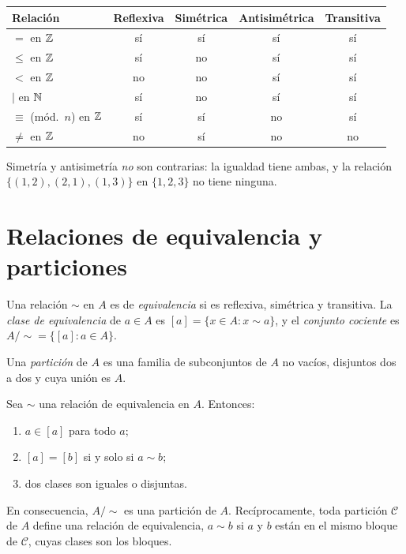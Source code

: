 \begin{center}\small
\begin{tabular}{@{}lcccc@{}}
\toprule
Relación & Reflexiva & Simétrica & Antisimétrica & Transitiva \\
\midrule
$=$ en $\mathbb{Z}$ & sí & sí & sí & sí \\
$\le$ en $\mathbb{Z}$ & sí & no & sí & sí \\
$<$ en $\mathbb{Z}$ & no & no & sí & sí \\
$\mid$ en $\mathbb{N}$ & sí & no & sí & sí \\
$\equiv$ (mód.\ $n$) en $\mathbb{Z}$ & sí & sí & no & sí \\
$\neq$ en $\mathbb{Z}$ & no & sí & no & no \\
\bottomrule
\end{tabular}
\end{center}

Simetría y antisimetría \emph{no} son contrarias: la igualdad tiene ambas, y la relación $\{(1,2),(2,1),(1,3)\}$ en $\{1,2,3\}$ no tiene ninguna.

\section{Relaciones de equivalencia y particiones}

\begin{definicion}
Una relación $\sim$ en $A$ es de \emph{equivalencia} si es reflexiva, simétrica y transitiva. La \emph{clase de equivalencia} de $a\in A$ es $[a]=\{x\in A: x\sim a\}$, y el \emph{conjunto cociente} es $A/{\sim}=\{[a]: a\in A\}$.
\end{definicion}

\begin{definicion}[Partición]
Una \emph{partición} de $A$ es una familia de subconjuntos de $A$ no vacíos, disjuntos dos a dos y cuya unión es $A$.
\end{definicion}

\begin{teorema}\label{teo:t5-particion}
Sea $\sim$ una relación de equivalencia en $A$. Entonces:
\begin{enumerate}
  \item $a\in[a]$ para todo $a$;
  \item $[a]=[b]$ si y solo si $a\sim b$;
  \item dos clases son iguales o disjuntas.
\end{enumerate}
En consecuencia, $A/{\sim}$ es una partición de $A$. Recíprocamente, toda partición $\mathcal{C}$ de $A$ define una relación de equivalencia, $a\sim b$ si $a$ y $b$ están en el mismo bloque de $\mathcal{C}$, cuyas clases son los bloques.
\end{teorema}

